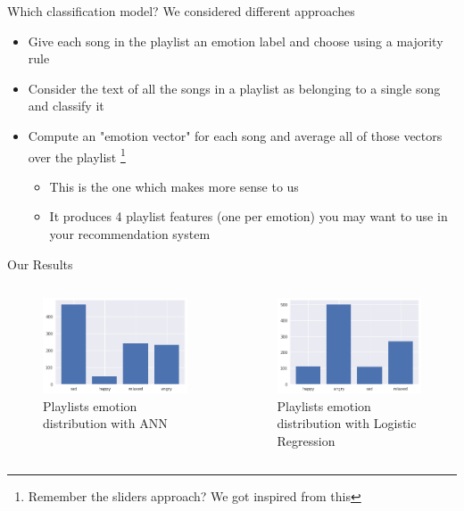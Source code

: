 \documentclass[xcolor=dvipsnames]{beamer}
\begin{document}
\begin{frame}{Which classification model?}
We considered different approaches
\begin{itemize}
\item Give each song in the playlist an emotion label and choose using a majority rule
\item Consider the text of all the songs in a playlist as belonging to a single song and classify it
\item Compute an "emotion vector" for each song and average all of those vectors over the playlist
	\footnote{Remember the sliders approach? We got inspired from this}
	\begin{itemize}
	\item This is the one which makes more sense to us
	\item It produces 4 playlist features (one per emotion) you may want to use in your recommendation system
	\end{itemize}
\end{itemize}
\end{frame}

\begin{frame}{Our Results}
\begin{columns}
\begin{figure}
	\includegraphics[scale=0.45,left]{./images/playlist-emotion-distribution-ann}
	\caption{Playlists emotion distribution with ANN}
\end{figure}

\begin{figure}
	\includegraphics[scale=0.45,left]{./images/playlist-emotion-distribution-logreg}
	\caption{Playlists emotion distribution with Logistic Regression}
\end{figure}
\end{columns}
\end{frame}
\end{document}
